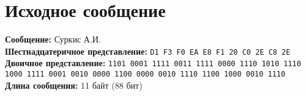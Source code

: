\section{Исходное сообщение}
\textbf{Сообщение:} Суркис А.И.\\
\textbf{Шестнадцатеричное представление:} \texttt{D1 F3 F0 EA E8 F1 20 C0 2E C8 2E}\\
\textbf{Двоичное представление:} \texttt{1101 0001 1111 0011 1111 0000 1110 1010 1110 1000 1111 0001 0010 0000 1100 0000 0010 1110 1100 1000 0010 1110}\\
\textbf{Длина сообщения:} 11 байт (88 бит)
